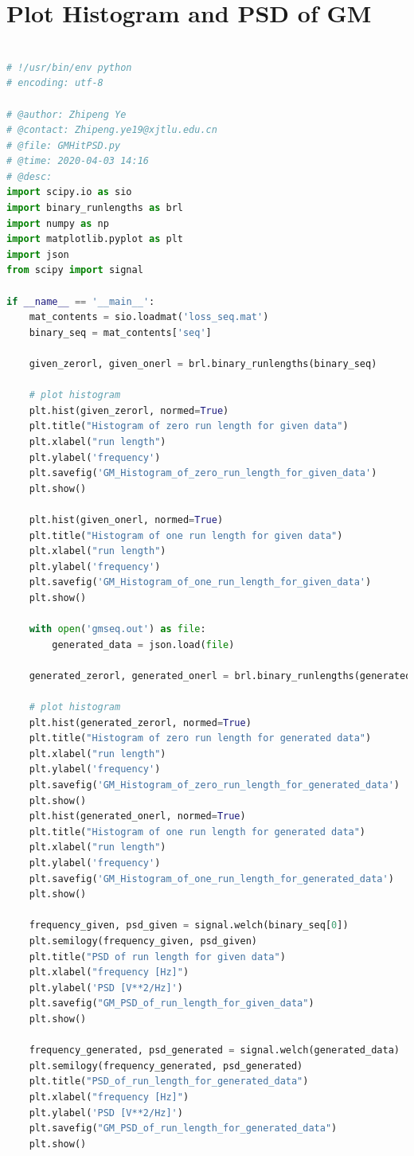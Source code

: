 \documentclass[11pt]{article}
\begin{document}
\section{Plot Histogram and PSD of GM}\label{PLTGM}
\begin{lstlisting}[language=Python] 

# !/usr/bin/env python
# encoding: utf-8

# @author: Zhipeng Ye
# @contact: Zhipeng.ye19@xjtlu.edu.cn
# @file: GMHitPSD.py
# @time: 2020-04-03 14:16
# @desc:
import scipy.io as sio
import binary_runlengths as brl
import numpy as np
import matplotlib.pyplot as plt
import json
from scipy import signal

if __name__ == '__main__':
    mat_contents = sio.loadmat('loss_seq.mat')
    binary_seq = mat_contents['seq']

    given_zerorl, given_onerl = brl.binary_runlengths(binary_seq)

    # plot histogram
    plt.hist(given_zerorl, normed=True)
    plt.title("Histogram of zero run length for given data")
    plt.xlabel("run length")
    plt.ylabel('frequency')
    plt.savefig('GM_Histogram_of_zero_run_length_for_given_data')
    plt.show()

    plt.hist(given_onerl, normed=True)
    plt.title("Histogram of one run length for given data")
    plt.xlabel("run length")
    plt.ylabel('frequency')
    plt.savefig('GM_Histogram_of_one_run_length_for_given_data')
    plt.show()

    with open('gmseq.out') as file:
        generated_data = json.load(file)

    generated_zerorl, generated_onerl = brl.binary_runlengths(generated_data)

    # plot histogram
    plt.hist(generated_zerorl, normed=True)
    plt.title("Histogram of zero run length for generated data")
    plt.xlabel("run length")
    plt.ylabel('frequency')
    plt.savefig('GM_Histogram_of_zero_run_length_for_generated_data')
    plt.show()
    plt.hist(generated_onerl, normed=True)
    plt.title("Histogram of one run length for generated data")
    plt.xlabel("run length")
    plt.ylabel('frequency')
    plt.savefig('GM_Histogram_of_one_run_length_for_generated_data')
    plt.show()

    frequency_given, psd_given = signal.welch(binary_seq[0])
    plt.semilogy(frequency_given, psd_given)
    plt.title("PSD of run length for given data")
    plt.xlabel("frequency [Hz]")
    plt.ylabel('PSD [V**2/Hz]')
    plt.savefig("GM_PSD_of_run_length_for_given_data")
    plt.show()

    frequency_generated, psd_generated = signal.welch(generated_data)
    plt.semilogy(frequency_generated, psd_generated)
    plt.title("PSD_of_run_length_for_generated_data")
    plt.xlabel("frequency [Hz]")
    plt.ylabel('PSD [V**2/Hz]')
    plt.savefig("GM_PSD_of_run_length_for_generated_data")
    plt.show()
\end{lstlisting}
\end{document}
